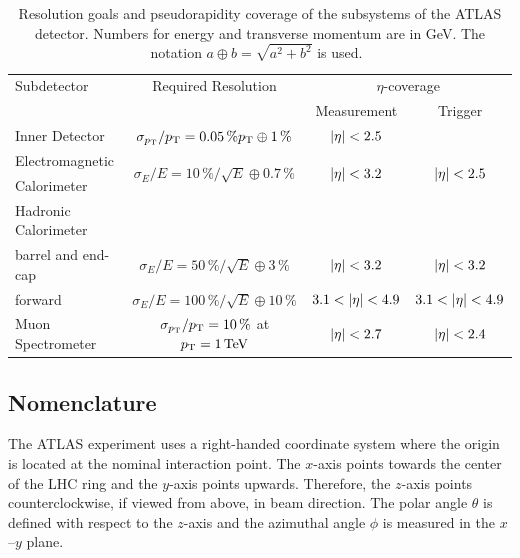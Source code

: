 \begin{table}[htpb]
    \centering
    \caption{Resolution goals and pseudorapidity coverage of the subsystems of the ATLAS detector.
            Numbers for energy and transverse momentum are in GeV.
            The notation $a \oplus b = \sqrt{a^2 + b^2}$ is used.~\cite{ATLAS}}\label{tab:setup:resolution}
    {\small
    \begin{tabular}{@{}lccc@{}}
        \toprule
        Subdetector & Required Resolution & \multicolumn{2}{c}{$\eta$-coverage}   \\
                    &                     & Measurement & Trigger \\ \midrule
        Inner Detector & $\sigma_{p_\text{T}} / p_\text{T} = 0.05\,\% p_\text{T} \oplus 1\,\%$ & $\left|\eta\right| < 2.5$ & \\ \cmidrule{0-3}
        Electromagnetic & \multirow{2}{*}{$\sigma_E / E = 10\,\% / \sqrt{E} \oplus 0.7\,\%$} & \multirow{2}{*}{$\left|\eta\right| < 3.2$} & \multirow{2}{*}{$\left|\eta\right| < 2.5$} \\
        Calorimeter & & & \\ \cmidrule{0-3}
        Hadronic Calorimeter & & & \\
        \quad barrel and end-cap & $\sigma_E / E = 50\,\% / \sqrt{E} \oplus 3\,\% $ & $\left|\eta\right| < 3.2$ & $\left|\eta\right| < 3.2$ \\
        \quad forward & $\sigma_E / E = 100\,\% / \sqrt{E} \oplus 10\,\% $ & $3.1 < \left|\eta\right| < 4.9$ & $3.1 < \left|\eta\right| < 4.9$ \\ \cmidrule{0-3}
        Muon Spectrometer & $\sigma_{p_\text{T}} / p_\text{T} = 10\,\%$ at $\pt = \SI{1}{\TeV}$ & $\left|\eta\right| < 2.7$ & $\left|\eta\right| < 2.4$ \\ \bottomrule
    \end{tabular}
    }
\end{table}


\subsection{Nomenclature}\label{sub:setup:nomenclature}

The ATLAS experiment uses a right-handed coordinate system where the origin is located at the nominal interaction point.
The $x$-axis points towards the center of the LHC ring and the $y$-axis points upwards.
Therefore, the $z$-axis points counterclockwise, if viewed from above, in beam direction.
The polar angle $\theta$ is defined with respect to the $z$-axis and the azimuthal angle $\phi$ is measured
in the $x$\nobreakdash--$y$ plane.

